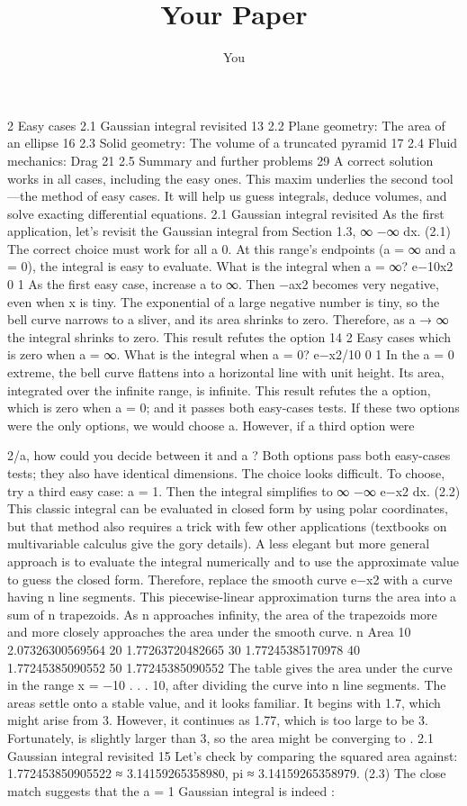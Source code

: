 \documentclass[a4paper]{article}
\title{Your Paper}
\author{You}
\begin{document}
2
Easy cases
2.1 Gaussian integral revisited 13
2.2 Plane geometry: The area of an ellipse 16
2.3 Solid geometry: The volume of a truncated pyramid 17
2.4 Fluid mechanics: Drag 21
2.5 Summary and further problems 29
A correct solution works in all cases, including the easy ones. This maxim
underlies the second tool—the method of easy cases. It will help us guess
integrals, deduce volumes, and solve exacting differential equations.
2.1 Gaussian integral revisited
As the first application, let’s revisit the Gaussian integral from Section 1.3,
∞
−∞
dx. (2.1)
The correct choice must work for all a  0. At this range’s endpoints
(a = ∞ and a = 0), the integral is easy to evaluate.
What is the integral when a = ∞?
e−10x2
0 1
As the first easy case, increase a to ∞. Then −ax2 becomes
very negative, even when x is tiny. The exponential
of a large negative number is tiny, so the bell curve
narrows to a sliver, and its area shrinks to zero. Therefore,
as a → ∞ the integral shrinks to zero. This result refutes the option
14 2 Easy cases
which is zero when a = ∞.
What is the integral when a = 0?
e−x2/10
0 1
In the a = 0 extreme, the bell curve flattens into a
horizontal line with unit height. Its area, integrated
over the infinite range, is infinite. This result refutes
the a option, which is zero when a = 0; and it
passes both easy-cases tests.
If these two options were the only options, we would choose a. However,
if a third option were

2/a, how could you decide between it and
a ? Both options pass both easy-cases tests; they also have identical
dimensions. The choice looks difficult.
To choose, try a third easy case: a = 1. Then the integral simplifies to
∞
−∞
e−x2
dx. (2.2)
This classic integral can be evaluated in closed form by using polar coordinates,
but that method also requires a trick with few other applications
(textbooks on multivariable calculus give the gory details). A less elegant
but more general approach is to evaluate the integral numerically and to
use the approximate value to guess the closed form.
Therefore, replace the smooth curve e−x2
with a curve
having n line segments. This piecewise-linear approximation
turns the area into a sum of n trapezoids. As
n approaches infinity, the area of the trapezoids more and more closely
approaches the area under the smooth curve.
n Area
10 2.07326300569564
20 1.77263720482665
30 1.77245385170978
40 1.77245385090552
50 1.77245385090552
The table gives the area under the curve in the
range x = −10 . . . 10, after dividing the curve
into n line segments. The areas settle onto a
stable value, and it looks familiar. It begins
with 1.7, which might arise from 
3. However,
it continues as 1.77, which is too large to be 
3.
Fortunately,  is slightly larger than 3, so the
area might be converging to .
2.1 Gaussian integral revisited 15
Let’s check by comparing the squared area against:
1.772453850905522 ≈ 3.14159265358980,
pi ≈ 3.14159265358979. (2.3)
The close match suggests that the a = 1 Gaussian integral is indeed :
\end{document}
